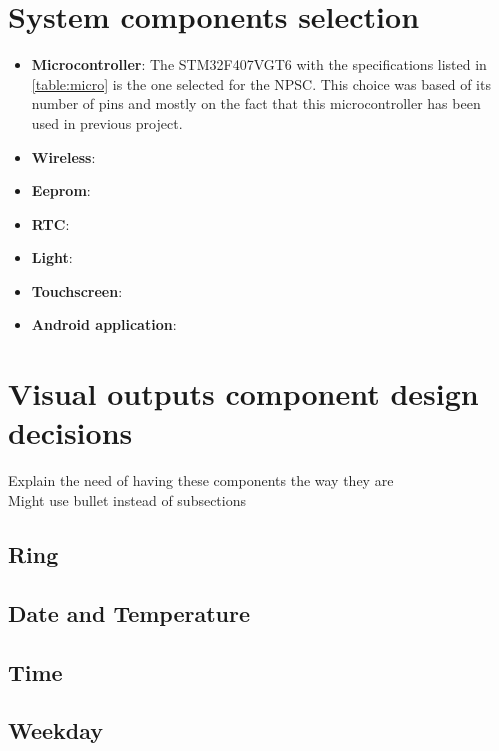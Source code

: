 \section{System components selection}

\begin{itemize}
\item \textbf{Microcontroller}: The STM32F407VGT6 with the specifications listed in \cref{table:micro} is the one selected for the NPSC. This choice was based of its number of pins and mostly on the fact that this microcontroller has been used in previous project. 
\item \textbf{Wireless}:
\item \textbf{Eeprom}:
\item \textbf{RTC}:
\item \textbf{Light}:
\item \textbf{Touchscreen}:
\item \textbf{Android application}:
\end{itemize}

\section{Visual outputs component design decisions}
Explain the need of having these components the way they are\\
Might use bullet instead of subsections
\subsection{Ring}
\subsection{Date and Temperature}
\subsection{Time}
\subsection{Weekday}
